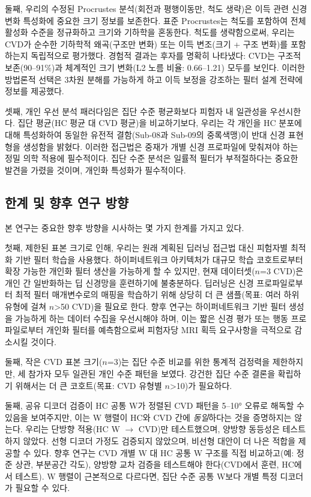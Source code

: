 \documentclass[12pt,a4paper]{article}
\begin{document}
둘째, 우리의 수정된 Procrustes 분석(회전과 평행이동만, 척도 생략)은 이득 관련 신경 변화 특성화에 중요한 크기 정보를 보존한다. 표준 Procrustes는 척도를 포함하여 전체 활성화 수준을 정규화하고 크기와 기하학을 혼동한다. 척도를 생략함으로써, 우리는 CVD가 순수한 기하학적 왜곡(구조만 변화) 또는 이득 변조(크기 + 구조 변화)를 포함하는지 독립적으로 평가했다. 경험적 결과는 후자를 명확히 나타냈다: CVD는 구조적 보존(90--91\%)과 체계적인 크기 변화(L2 노름 비율: 0.66--1.21) 모두를 보인다. 이러한 방법론적 선택은 3차원 분해를 가능하게 하고 이득 보정을 강조하는 필터 설계 전략에 정보를 제공했다.

셋째, 개인 우선 분석 패러다임은 집단 수준 평균화보다 피험자 내 일관성을 우선시한다. 집단 평균(HC 평균 대 CVD 평균)을 비교하기보다, 우리는 각 개인을 HC 분포에 대해 특성화하여 동일한 유전적 결함(Sub-08과 Sub-09의 중록색맹)이 반대 신경 표현형을 생성함을 밝혔다. 이러한 접근법은 중재가 개별 신경 프로파일에 맞춰져야 하는 정밀 의학 적용에 필수적이다. 집단 수준 분석은 일률적 필터가 부적절하다는 중요한 발견을 가렸을 것이며, 개인화 특성화가 필수적이다.

\subsection{한계 및 향후 연구 방향}

본 연구는 중요한 향후 방향을 시사하는 몇 가지 한계를 가지고 있다.

첫째, 제한된 표본 크기로 인해, 우리는 원래 계획된 딥러닝 접근법 대신 피험자별 최적화 기반 필터 학습을 사용했다. 하이퍼네트워크 아키텍처가 대규모 학습 코호트로부터 확장 가능한 개인화 필터 생산을 가능하게 할 수 있지만, 현재 데이터셋($n$=3 CVD)은 개인 간 일반화하는 딥 신경망을 훈련하기에 불충분하다. 딥러닝은 신경 프로파일로부터 최적 필터 매개변수로의 매핑을 학습하기 위해 상당히 더 큰 샘플(목표: 여러 하위 유형에 걸쳐 $n$>50 CVD)을 필요로 한다. 향후 연구는 하이퍼네트워크 기반 필터 생성을 가능하게 하는 데이터 수집을 우선시해야 하며, 이는 짧은 신경 평가 또는 행동 프로파일로부터 개인화 필터를 예측함으로써 피험자당 MRI 획득 요구사항을 극적으로 감소시킬 것이다.

둘째, 작은 CVD 표본 크기($n$=3)는 집단 수준 비교를 위한 통계적 검정력을 제한하지만, 세 참가자 모두 일관된 개인 수준 패턴을 보였다. 강건한 집단 수준 결론을 확립하기 위해서는 더 큰 코호트(목표: CVD 유형별 $n$>10)가 필요하다.

둘째, 공유 디코더 검증이 HC 공통 W가 정렬된 CVD 패턴을 5--10° 오류로 해독할 수 있음을 보여주지만, 이는 W 행렬이 HC와 CVD 간에 \textit{동일}하다는 것을 증명하지는 않는다. 우리는 단방향 적용(HC W $\rightarrow$ CVD)만 테스트했으며, 양방향 동등성은 테스트하지 않았다. 선형 디코더 가정도 검증되지 않았으며, 비선형 대안이 더 나은 적합을 제공할 수 있다. 향후 연구는 CVD 개별 W 대 HC 공통 W 구조를 직접 비교하고(예: 정준 상관, 부분공간 각도), 양방향 교차 검증을 테스트해야 한다(CVD에서 훈련, HC에서 테스트). W 행렬이 근본적으로 다르다면, 집단 수준 공통 W보다 개별 특정 디코더가 필요할 수 있다.
\end{document}
